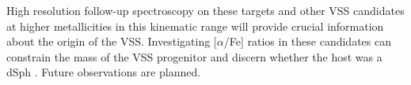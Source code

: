 \documentclass[preprint2]{aastex}
\begin{document}
	
	
	
	

	High resolution follow-up spectroscopy on these targets and other VSS candidates at higher metallicities in this kinematic range will provide crucial information about the origin of the VSS.  Investigating [$\alpha$/Fe] ratios in these candidates can constrain the mass of the VSS progenitor and discern whether the host was a dSph \citep{Venn;et-al_2004, Casetti-Dinescu;et-al_2009}.  Future observations are planned.
\end{document}
